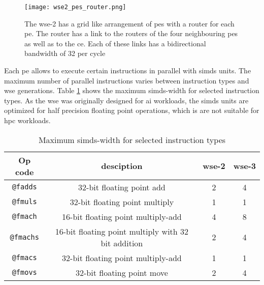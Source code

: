 \begin{figure}[h]
    \centering
    \texttt{[image: wse2\_pes\_router.png]}
    \caption{The \ac{wse}-2 has a grid like arrangement of \acp{pe} with a router for each \ac{pe}. The router has a link to the routers of the four neighbouring \acp{pe} as well as to the \ac{ce}. Each of these links has a bidirectional bandwidth of \qty{32}{\bit} per cycle \cite{lie2023cerebras}}
    \label{fig:wse2_pes_router}
\end{figure}

Each \ac{pe} allows to execute certain instructions in parallel with \acp{simd} units. The maximum number of parallel instructions varies between instruction types and \ac{wse} generations. Table \ref{tab:simd_operations} shows the maximum \acp{simd}-width for selected instruction types. As the \ac{wse} was originally designed for \ac{ai} workloads, the \acp{simd} units are optimized for half precision floating point operations, which is are not suitable for \ac{hpc} workloads.

\begin{table}[h]
    \centering
    \caption{Maximum \acp{simd}-width for selected instruction types}
    \label{tab:simd_operations}
    \begin{tabular}{@{}cccc@{}}
        \toprule
        Op code & desciption & \ac{wse}-2 & \ac{wse}-3 \\
        \midrule
        \texttt{@fadds} & 32-bit floating point add & 2 & 4 \\
        \texttt{@fmuls} & 32-bit floating point multiply & 1 & 1 \\
        \texttt{@fmach} & 16-bit floating point multiply-add & 4 & 8 \\
        \texttt{@fmachs} & 16-bit floating point multiply with 32 bit addition & 2 & 4 \\
        \texttt{@fmacs} & 32-bit floating point multiply-add & 1 & 1 \\
        \texttt{@fmovs} & 32-bit floating point move & 2 & 4 \\
        \bottomrule
    \end{tabular}
\end{table}

